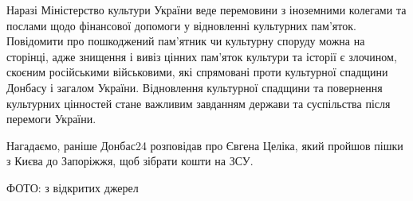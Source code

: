 Наразі Міністерство культури України веде перемовини з іноземними колегами та
послами щодо фінансової допомоги у відновленні культурних пам'яток. Повідомити
про пошкоджений пам'ятник чи культурну споруду можна на сторінці, адже знищення
і вивіз цінних пам'яток культури та історії є злочином, скоєним російськими
військовими, які спрямовані проти культурної спадщини Донбасу і загалом
України. Відновлення культурної спадщини та повернення культурних цінностей
стане важливим завданням держави та суспільства після перемоги України.

Нагадаємо, раніше Донбас24 розповідав про Євгена Целіка, який пройшов пішки з
Києва до Запоріжжя, щоб зібрати кошти на ЗСУ.

ФОТО: з відкритих джерел
